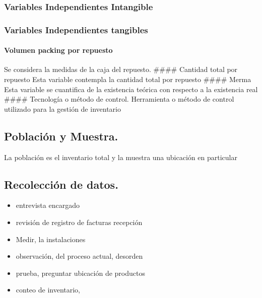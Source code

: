 \documentclass[
]{article}
\providecommand{\tightlist}{%
  \setlength{\itemsep}{0pt}\setlength{\parskip}{0pt}}
\begin{document}
\hypertarget{variables-independientes-intangible-1}{%
\subsubsection{Variables Independientes
Intangible}\label{variables-independientes-intangible-1}}

\hypertarget{variables-independientes-tangibles-1}{%
\subsubsection{Variables Independientes
tangibles}\label{variables-independientes-tangibles-1}}

\hypertarget{volumen-packing-por-repuesto}{%
\paragraph{Volumen packing por
repuesto}\label{volumen-packing-por-repuesto}}

Se considera la medidas de la caja del repuesto. \#\#\#\# Cantidad total
por repuesto Esta variable contempla la cantidad total por repuesto
\#\#\#\# Merma Esta variable se cuantifica de la existencia teórica con
respecto a la existencia real \#\#\#\# Tecnología o método de control.
Herramienta o método de control utilizado para la gestión de inventario

\hypertarget{poblaciuxf3n-y-muestra.}{%
\subsection{Población y Muestra.}\label{poblaciuxf3n-y-muestra.}}

La población es el inventario total y la muestra una ubicación en
particular

\hypertarget{recolecciuxf3n-de-datos.}{%
\subsection{Recolección de datos.}\label{recolecciuxf3n-de-datos.}}

\begin{itemize}
\tightlist
\item
  entrevista encargado
\item
  revisión de registro de facturas recepción
\item
  Medir, la instalaciones
\item
  observación, del proceso actual, desorden
\item
  prueba, preguntar ubicación de productos
\item
  conteo de inventario,
\end{itemize}
\end{document}
